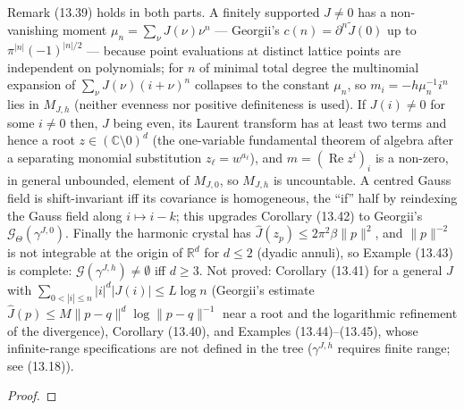 \begin{theorem}
    Remark (13.39) holds in both parts. A finitely supported $J \neq 0$ has a non-vanishing moment
    $\mu_n = \sum_\nu J(\nu)\nu^n$ --- Georgii's $c(n) = \partial^n\tilde J(0)$ up to
    $\pi^{|n|}(-1)^{|n|/2}$ --- because point evaluations at distinct lattice points are
    independent on polynomials; for $n$ of minimal total degree the multinomial expansion of
    $\sum_\nu J(\nu)(i+\nu)^n$ collapses to the constant $\mu_n$, so $m_i = -h\mu_n^{-1}i^n$ lies in
    $M_{J,h}$ (neither evenness nor positive definiteness is used). If $J(i) \neq 0$ for some
    $i \neq 0$ then, $J$ being even, its Laurent transform has at least two terms and hence a root
    $z \in (\mathbb C\setminus 0)^d$ (the one-variable fundamental theorem of algebra after a
    separating monomial substitution $z_\ell = w^{a_\ell}$), and $m = (\operatorname{Re} z^i)_i$ is a
    non-zero, in general unbounded, element of $M_{J,0}$, so $M_{J,h}$ is uncountable. A centred
    Gauss field is shift-invariant iff its covariance is homogeneous, the ``if'' half by reindexing
    the Gauss field along $i \mapsto i-k$; this upgrades Corollary (13.42) to Georgii's
    $\mathcal G_\Theta(\gamma^{J,0})$. Finally the harmonic crystal has $\hat J(z_p) \leq
    2\pi^2\beta\|p\|^2$, and $\|p\|^{-2}$ is not integrable at the origin of $\mathbb R^d$ for
    $d \leq 2$ (dyadic annuli), so Example (13.43) is complete: $\mathcal G(\gamma^{J,h}) \neq
    \emptyset$ iff $d \geq 3$. Not proved: Corollary (13.41) for a general $J$ with
    $\sum_{0<|i|\leq n}|i|^d|J(i)| \leq L\log n$ (Georgii's estimate $\hat J(p) \leq M\|p-q\|^d
    \log\|p-q\|^{-1}$ near a root and the logarithmic refinement of the divergence), Corollary
    (13.40), and Examples (13.44)--(13.45), whose infinite-range specifications are not defined in
    the tree ($\gamma^{J,h}$ requires finite range; see (13.18)).
\end{theorem}
\begin{proof}
    \leanok
\end{proof}
